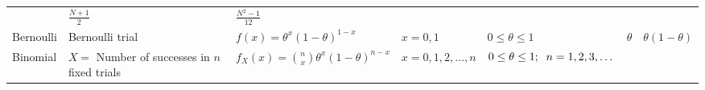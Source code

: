 \documentclass[]{book}
\begin{document}
\begin{landscape}
\begin{longtable}[]{@{}lllllll@{}}
\begin{minipage}[t]{0.16\columnwidth}
\end{minipage} & \begin{minipage}[t]{0.05\columnwidth}\raggedright
\(\frac{N+1}{2}\)\strut
\end{minipage} & \begin{minipage}[t]{0.09\columnwidth}\raggedright
\(\frac{N^2-1}{12}\)\strut
\end{minipage}\tabularnewline
\begin{minipage}[t]{0.10\columnwidth}\raggedright
Bernoulli\strut
\end{minipage} & \begin{minipage}[t]{0.13\columnwidth}\raggedright
Bernoulli trial\strut
\end{minipage} & \begin{minipage}[t]{0.16\columnwidth}\raggedright
\(f(x) = \theta^x (1-\theta)^{1-x}\)\strut
\end{minipage} & \begin{minipage}[t]{0.14\columnwidth}\raggedright
\(x=0,1\)\strut
\end{minipage} & \begin{minipage}[t]{0.16\columnwidth}\raggedright
\(0\leq \theta \leq 1\)\strut
\end{minipage} & \begin{minipage}[t]{0.05\columnwidth}\raggedright
\(\theta\)\strut
\end{minipage} & \begin{minipage}[t]{0.09\columnwidth}\raggedright
\(\theta (1-\theta)\)\strut
\end{minipage}\tabularnewline
\begin{minipage}[t]{0.10\columnwidth}\raggedright
Binomial\strut
\end{minipage} & \begin{minipage}[t]{0.13\columnwidth}\raggedright
\(X=\) Number of successes in \(n\) fixed trials\strut
\end{minipage} & \begin{minipage}[t]{0.16\columnwidth}\raggedright
\(f_X(x) = {n\choose x}\theta ^x(1-\theta)^{n-x}\)\strut
\end{minipage} & \begin{minipage}[t]{0.14\columnwidth}\raggedright
\(x=0,1,2,\dots, n\)\strut
\end{minipage} & \begin{minipage}[t]{0.16\columnwidth}\raggedright
\(0\leq \theta \leq 1; \;\;\; \newline n =1,2,3,\dots\)\strut
\end{minipage} & \begin{minipage}[t]{0.05\columnwidth}\raggedright

\end{minipage}
\end{longtable}
\end{landscape}
\end{document}
